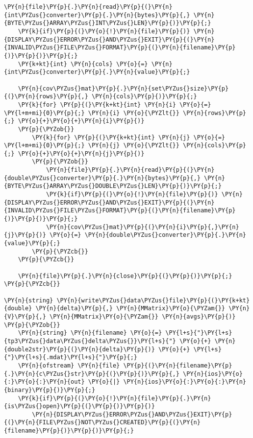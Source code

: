 \begin{Verbatim}[commandchars=\\\{\}]
    \PY{n}{file}\PY{p}{.}\PY{n}{read}\PY{p}{(}\PY{n}{int\PYZus{}converter}\PY{p}{.}\PY{n}{bytes}\PY{p}{,} \PY{n}{BYTE\PYZus{}ARRAY\PYZus{}INT\PYZus{}LEN}\PY{p}{)}\PY{p}{;}
    \PY{k}{if}\PY{p}{(}\PY{o}{!}\PY{n}{file}\PY{p}{)} \PY{n}{DISPLAY\PYZus{}ERROR\PYZus{}AND\PYZus{}EXIT}\PY{p}{(}\PY{n}{INVALID\PYZus{}FILE\PYZus{}FORMAT}\PY{p}{(}\PY{n}{filename}\PY{p}{)}\PY{p}{)}\PY{p}{;}
    \PY{k+kt}{int} \PY{n}{cols} \PY{o}{=} \PY{n}{int\PYZus{}converter}\PY{p}{.}\PY{n}{value}\PY{p}{;}

    \PY{n}{cov\PYZus{}mat}\PY{p}{.}\PY{n}{set\PYZus{}size}\PY{p}{(}\PY{n}{rows}\PY{p}{,} \PY{n}{cols}\PY{p}{)}\PY{p}{;}
    \PY{k}{for} \PY{p}{(}\PY{k+kt}{int} \PY{n}{i} \PY{o}{=} \PY{l+m+mi}{0}\PY{p}{;} \PY{n}{i} \PY{o}{\PYZlt{}} \PY{n}{rows}\PY{p}{;} \PY{o}{+}\PY{o}{+}\PY{n}{i}\PY{p}{)}
    \PY{p}{\PYZob{}}
    	\PY{k}{for} \PY{p}{(}\PY{k+kt}{int} \PY{n}{j} \PY{o}{=} \PY{l+m+mi}{0}\PY{p}{;} \PY{n}{j} \PY{o}{\PYZlt{}} \PY{n}{cols}\PY{p}{;} \PY{o}{+}\PY{o}{+}\PY{n}{j}\PY{p}{)}
    	\PY{p}{\PYZob{}}
    		\PY{n}{file}\PY{p}{.}\PY{n}{read}\PY{p}{(}\PY{n}{double\PYZus{}converter}\PY{p}{.}\PY{n}{bytes}\PY{p}{,} \PY{n}{BYTE\PYZus{}ARRAY\PYZus{}DOUBLE\PYZus{}LEN}\PY{p}{)}\PY{p}{;}
    		\PY{k}{if}\PY{p}{(}\PY{o}{!}\PY{n}{file}\PY{p}{)} \PY{n}{DISPLAY\PYZus{}ERROR\PYZus{}AND\PYZus{}EXIT}\PY{p}{(}\PY{n}{INVALID\PYZus{}FILE\PYZus{}FORMAT}\PY{p}{(}\PY{n}{filename}\PY{p}{)}\PY{p}{)}\PY{p}{;}
    		\PY{n}{cov\PYZus{}mat}\PY{p}{(}\PY{n}{i}\PY{p}{,}\PY{n}{j}\PY{p}{)} \PY{o}{=} \PY{n}{double\PYZus{}converter}\PY{p}{.}\PY{n}{value}\PY{p}{;}
    	\PY{p}{\PYZcb{}}
    \PY{p}{\PYZcb{}}

    \PY{n}{file}\PY{p}{.}\PY{n}{close}\PY{p}{(}\PY{p}{)}\PY{p}{;}
\PY{p}{\PYZcb{}}

\PY{n}{string} \PY{n}{write\PYZus{}data\PYZus{}file}\PY{p}{(}\PY{k+kt}{double} \PY{n}{delta}\PY{p}{,} \PY{n}{MMatrix}\PY{o}{\PYZam{}} \PY{n}{V}\PY{p}{,} \PY{n}{MMatrix}\PY{o}{\PYZam{}} \PY{n}{avgs}\PY{p}{)}
\PY{p}{\PYZob{}}
	\PY{n}{string} \PY{n}{filename} \PY{o}{=} \PY{l+s}{"}\PY{l+s}{tp3\PYZus{}data\PYZus{}delta\PYZus{}}\PY{l+s}{"} \PY{o}{+} \PY{n}{double2str}\PY{p}{(}\PY{n}{delta}\PY{p}{)} \PY{o}{+} \PY{l+s}{"}\PY{l+s}{.mdat}\PY{l+s}{"}\PY{p}{;}
	\PY{n}{ofstream} \PY{n}{file} \PY{p}{(}\PY{n}{filename}\PY{p}{.}\PY{n}{c\PYZus{}str}\PY{p}{(}\PY{p}{)}\PY{p}{,} \PY{n}{ios}\PY{o}{:}\PY{o}{:}\PY{n}{out} \PY{o}{|} \PY{n}{ios}\PY{o}{:}\PY{o}{:}\PY{n}{binary}\PY{p}{)}\PY{p}{;}
	\PY{k}{if}\PY{p}{(}\PY{o}{!}\PY{n}{file}\PY{p}{.}\PY{n}{is\PYZus{}open}\PY{p}{(}\PY{p}{)}\PY{p}{)}
		\PY{n}{DISPLAY\PYZus{}ERROR\PYZus{}AND\PYZus{}EXIT}\PY{p}{(}\PY{n}{FILE\PYZus{}NOT\PYZus{}CREATED}\PY{p}{(}\PY{n}{filename}\PY{p}{)}\PY{p}{)}\PY{p}{;}


\end{Verbatim}
